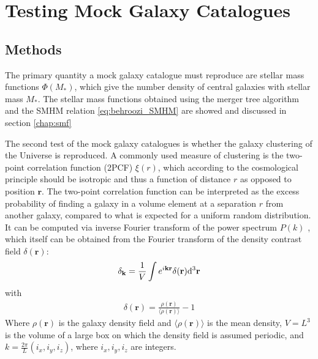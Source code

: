\section{Testing Mock Galaxy Catalogues}\label{chap:mock_catalogues}


\subsection{Methods}


The primary quantity a mock galaxy catalogue must reproduce are stellar mass functions $\Phi(M_*)$, which give the number density of central galaxies with stellar mass $M_*$. 
The stellar mass functions obtained using the merger tree algorithm and the SMHM relation \eqref{eq:behroozi_SMHM} are showed and discussed in section \ref{chap:smf}


The second test of the mock galaxy catalogues is whether the galaxy clustering of the Universe is reproduced.
A commonly used measure of clustering is the two-point correlation function (2PCF) $\xi(r)$, which according to the cosmological principle should be isotropic and thus a function of distance $r$ as opposed to position $\mathbf{r}$.
The two-point correlation function can be interpreted as the excess probability of finding a galaxy in a volume element at a separation $r$ from another galaxy, compared to what is expected for a uniform random distribution.
It can be computed via inverse Fourier transform of the power spectrum $P(k)$ \parencite{Mo}, which itself can be obtained from the Fourier transform of the density contrast field $\delta(\mathbf{r})$:
%
\begin{align}
	\delta_\mathbf{k} = \frac{1}{V}\int e^{i\mathbf{kr}} \delta(\mathbf{r}) \mathrm{d} ^3 \mathbf{r}
\end{align}
%
with
%
\begin{align}
	\delta(\mathbf{r}) = \frac{\rho(\mathbf{r})}{\langle \rho(\mathbf{r}) \rangle } - 1
\end{align}
%
Where $\rho(\mathbf{r})$ is the galaxy density field and $\langle \rho(\mathbf{r}) \rangle$ is the mean density, $V = L^3$ is the volume of a large box on which the density field is assumed periodic, and $k=\frac{2\pi}{L}(i_x, i_y, i_z)$, where $i_x, i_y, i_z$ are integers.

